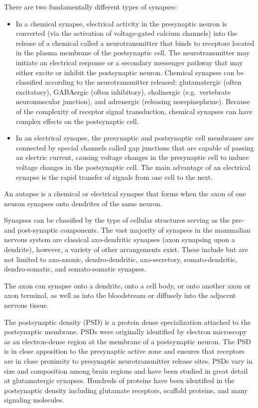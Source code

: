 \documentclass[]{book}
\providecommand{\tightlist}{%
  \setlength{\itemsep}{0pt}\setlength{\parskip}{0pt}}
\begin{document}
There are two fundamentally different types of synapses:

\begin{itemize}
\tightlist
\item
  In a chemical synapse, electrical activity in the presynaptic neuron is converted (via the activation of voltage-gated calcium channels) into the release of a chemical called a neurotransmitter that binds to receptors located in the plasma membrane of the postsynaptic cell. The neurotransmitter may initiate an electrical response or a secondary messenger pathway that may either excite or inhibit the postsynaptic neuron. Chemical synapses can be classified according to the neurotransmitter released: glutamatergic (often excitatory), GABAergic (often inhibitory), cholinergic (e.g.~vertebrate neuromuscular junction), and adrenergic (releasing norepinephrine). Because of the complexity of receptor signal transduction, chemical synapses can have complex effects on the postsynaptic cell.
\item
  In an electrical synapse, the presynaptic and postsynaptic cell membranes are connected by special channels called gap junctions that are capable of passing an electric current, causing voltage changes in the presynaptic cell to induce voltage changes in the postsynaptic cell. The main advantage of an electrical synapse is the rapid transfer of signals from one cell to the next.
\end{itemize}

An autapse is a chemical or electrical synapse that forms when the axon of one neuron synapses onto dendrites of the same neuron.

Synapses can be classified by the type of cellular structures serving as the pre- and post-synaptic components. The vast majority of synapses in the mammalian nervous system are classical axo-dendritic synapses (axon synapsing upon a dendrite), however, a variety of other arrangements exist. These include but are not limited to axo-axonic, dendro-dendritic, axo-secretory, somato-dendritic, dendro-somatic, and somato-somatic synapses.

The axon can synapse onto a dendrite, onto a cell body, or onto another axon or axon terminal, as well as into the bloodstream or diffusely into the adjacent nervous tissue.

The postsynaptic density (PSD) is a protein dense specialization attached to the postsynaptic membrane. PSDs were originally identified by electron microscopy as an electron-dense region at the membrane of a postsynaptic neuron. The PSD is in close apposition to the presynaptic active zone and ensures that receptors are in close proximity to presynaptic neurotransmitter release sites. PSDs vary in size and composition among brain regions and have been studied in great detail at glutamatergic synapses. Hundreds of proteins have been identified in the postsynaptic density including glutamate receptors, scaffold proteins, and many signaling molecules.
\end{document}
